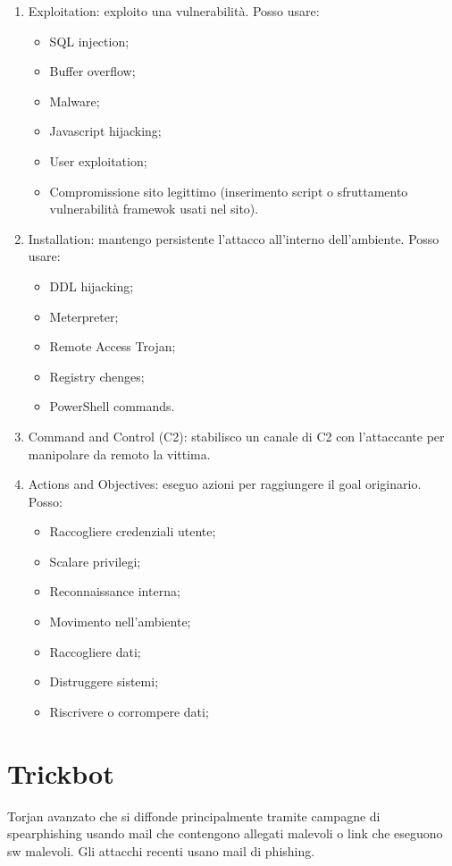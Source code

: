 \begin{enumerate}
\item Exploitation: exploito una vulnerabilità. Posso usare:
\begin{itemize}
    \item SQL injection;
    \item Buffer overflow;
    \item Malware;
    \item Javascript hijacking;
    \item User exploitation;
    \item Compromissione sito legittimo (inserimento script o sfruttamento vulnerabilità framewok usati nel sito).
\end{itemize}

\item Installation: mantengo persistente l'attacco all'interno dell'ambiente. Posso usare:
\begin{itemize}
    \item DDL hijacking;
\item Meterpreter;
\item Remote Access Trojan;
\item Registry chenges;
\item PowerShell commands.
\end{itemize}

\item Command and Control (C2): stabilisco un canale di C2 con l'attaccante per manipolare da remoto la vittima.

\item Actions and Objectives: eseguo azioni per raggiungere il goal originario. Posso:
\begin{itemize}
    \item Raccogliere credenziali utente;
\item Scalare privilegi;
\item Reconnaissance interna;
\item Movimento nell'ambiente;
\item Raccogliere dati;
\item Distruggere sistemi;
\item Riscrivere o corrompere dati;
\end{itemize}
\end{enumerate}

\section{Trickbot}
Torjan avanzato che si diffonde principalmente tramite campagne di spearphishing usando mail che contengono allegati malevoli o link che eseguono sw malevoli. Gli attacchi recenti usano mail di phishing.